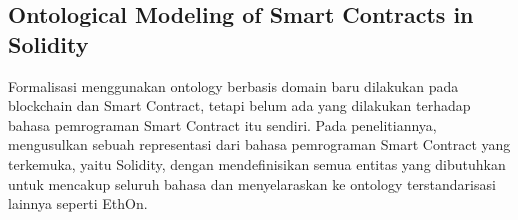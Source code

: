 \subsection{Ontological Modeling of Smart Contracts in Solidity}
\label{subsec:solidity-ontology}

Formalisasi menggunakan ontology berbasis domain baru dilakukan pada blockchain dan Smart Contract, tetapi belum ada yang dilakukan terhadap bahasa pemrograman Smart Contract itu sendiri. Pada penelitiannya, \cite{cano2021toward} mengusulkan sebuah representasi dari bahasa pemrograman Smart Contract yang terkemuka, yaitu Solidity, dengan mendefinisikan semua entitas yang dibutuhkan untuk mencakup seluruh bahasa dan menyelaraskan ke ontology terstandarisasi lainnya seperti EthOn.


